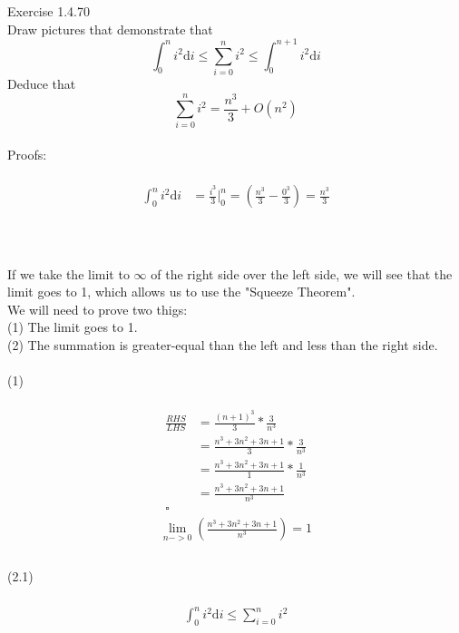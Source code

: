\documentclass{article}
\begin{document}
	Exercise 1.4.70\\
	Draw pictures that demonstrate that
	$$ \int_{0}^{n}{i^2\mathrm{d}i} \le \sum_{i=0}^{n}{i^2} \le \int_{0}^{n+1}{i^2\mathrm{d}i} $$
	Deduce that
	$$ \sum_{i=0}^{n}{i^2}=\frac{n^3}{3} + O(n^2) $$
	\\
	Proofs:\\
	\\
	\begin{align*}
		\int_{0}^{n}{i^2\mathrm{d}i} &= \frac{i^3}{3}\Big|_0^n = (\frac{n^3}{3}-\frac{0^3}{3}) = \frac{n^3}{3}\\
	\end{align*}
	\\
	\\
	If we take the limit to $\infty$ of the right side over the left side, we will see that the limit goes to 1, which allows us to use the "Squeeze Theorem".\\
	We will need to prove two thigs:\\
	(1) The limit goes to 1.\\
	(2) The summation is greater-equal than the left and less than the right side.\\
	\pagebreak
	\\
	(1)\\
	\\
	\begin{align*}
		\frac{RHS}{LHS} &= \frac{(n+1)^3}{3}*\frac{3}{n^3}\\
		&=\frac{n^{3} + 3n^{2} + 3n + 1}{3}*\frac{3}{n^3}\\
		&=\frac{n^{3} + 3n^{2} + 3n + 1}{1}*\frac{1}{n^3}\\
		&=\frac{n^{3} + 3n^{2} + 3n + 1}{n^3}\\
		\square
	\end{align*}
	\begin{align*}
		\lim_{n->0}{(\frac{n^{3} + 3n^{2} + 3n + 1}{n^3})} = 1\\
	\end{align*}
	\\
	(2.1)\\
	\\
	\begin{align*}
		\int_{0}^{n}{i^2\mathrm{d}i} \le \sum_{i=0}^{n}{i^2}
	\end{align*}
\end{document}
